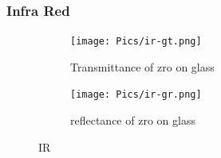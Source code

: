 

\subsubsection{Infra Red}

\begin{figure}[htb]
    \centering
    \begin{subfigure}{.49\textwidth}
        \centering
        \texttt{[image: Pics/ir-gt.png]}
        \caption{Transmittance of \gls{zro} on glass} \label{fig:ir-gt}
    \end{subfigure}
    \begin{subfigure}{.49\textwidth}
        \centering
        \texttt{[image: Pics/ir-gr.png]}
        \caption{reflectance of \gls{zro} on glass} \label{fig:ir-gr}
    \end{subfigure}
    \caption{IR} \label{fig:ir}
\end{figure}

